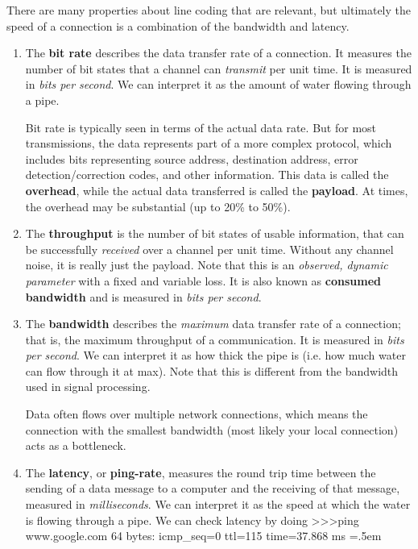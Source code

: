 \documentclass{article}
\newenvironment{cverbatim}
    {\SaveVerbatim{cverb}}
    {\endSaveVerbatim
    \flushleft\fboxrule=0pt\fboxsep=.5em
    \colorbox{cverbbg}{%
      \makebox[\dimexpr\linewidth-2\fboxsep][l]{\BUseVerbatim{cverb}}%
    }
    \endflushleft
  }
\begin{document}
    \begin{definition}
      There are many properties about line coding that are relevant, but ultimately the speed of a connection is a combination of the bandwidth and latency. 

      \begin{enumerate}
        \item The \textbf{bit rate} describes the data transfer rate of a connection. It measures the number of bit states that a channel can \textit{transmit} per unit time. It is measured in \textit{bits per second}. We can interpret it as the amount of water flowing through a pipe. 
        
        Bit rate is typically seen in terms of the actual data rate. But for most transmissions, the data represents part of a more complex protocol, which includes bits representing source address, destination address, error detection/correction codes, and other information. This data is called the \textbf{overhead}, while the actual data transferred is called the \textbf{payload}. At times, the overhead may be substantial (up to 20\% to 50\%). 

        \item The \textbf{throughput} is the number of bit states of usable information, that can be successfully \textit{received} over a channel per unit time. Without any channel noise, it is really just the payload. Note that this is an \textit{observed, dynamic parameter} with a fixed and variable loss. It is also known as \textbf{consumed bandwidth} and is measured in \textit{bits per second}. 
        
        \item The \textbf{bandwidth} describes the \textit{maximum} data transfer rate of a connection; that is, the maximum throughput of a communication. It is measured in \textit{bits per second}. We can interpret it as how thick the pipe is (i.e. how much water can flow through it at max). Note that this is different from the bandwidth used in signal processing. 
        
        Data often flows over multiple network connections, which means the connection with the smallest bandwidth (most likely your local connection) acts as a bottleneck. 
        
        \item The \textbf{latency}, or \textbf{ping-rate}, measures the round trip time between the sending of a data message to a computer and the receiving of that message, measured in \textit{milliseconds}. We can interpret it as the speed at which the water is flowing through a pipe. We can check latency by doing
        \begin{cverbatim}
          >>>ping www.google.com
          64 bytes: icmp_seq=0 ttl=115 time=37.868 ms
        \end{cverbatim}


\end{enumerate}
\end{definition}
\end{document}
